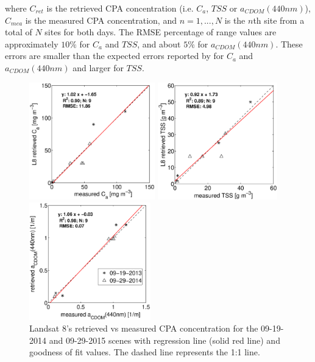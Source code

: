 \documentclass[onecolumn,3p,letterpaper]{elsarticle}
\begin{document}
\noindent where $C_{ret}$ is the retrieved CPA concentration (i.e. $C_a$, $TSS$ or $a_{CDOM}(440nm)$), $C_{mea}$ is the measured CPA concentration, and $n=1,...,N$ is the $n$th site from a total of $N$ sites for both days. The RMSE percentage of range values are approximately $10\%$ for $C_a$ and $TSS$, and about $5\%$ for $a_{CDOM}(440nm)$. These errors are smaller than the expected errors reported by \cite*{Gerace:2013} for $C_a$ and $a_{CDOM}(440nm)$ and larger for $TSS$. 

\begin{figure}[htb]
  \begin{minipage}[c]{0.32\linewidth}
      \includegraphics[trim=40 0 80 0,clip,height=5.1cm]{./Images/CHLretvsmea150423}  
  \end{minipage}
  \begin{minipage}[d]{0.32\linewidth}
      \includegraphics[trim=40 0 80 0,clip,height=5.1cm]{./Images/TSSretvsmea150423}
  \end{minipage}
  \begin{minipage}[c]{0.32\linewidth}
      \includegraphics[trim=40 0 80 0,clip,height=5.1cm]{./Images/CDOMretvsmea150423}  
  \end{minipage}

  \caption{Landsat 8's retrieved vs measured CPA concentration for the 09-19-2014 and 09-29-2015 scenes with regression line (solid red line) and goodness of fit values. The dashed line represents the 1:1 line. \label{fig:CPAsRetVSMea} } 
\end{figure}
\end{document}
